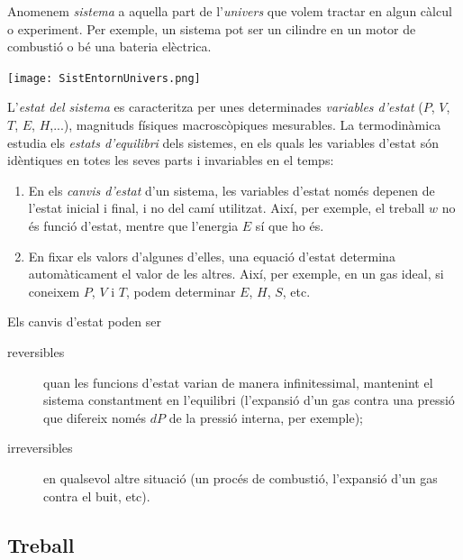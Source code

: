 \begin{mybox}[title={Sistemes, estats i funcions d'estat}]
    Anomenem \emph{sistema} a aquella part de l'\emph{univers} que volem tractar en algun càlcul o experiment. 
Per exemple, un sistema pot ser un cilindre en un motor de combustió o bé una bateria elèctrica.
\begin{center}
\texttt{[image: SistEntornUnivers.png]}
\end{center}
 
L'\textit{estat del sistema} es caracteritza  per unes determinades \textit{variables d'estat} ($P$, $V$, $T$, $E$, $H$,...), magnituds físiques macroscòpiques mesurables. La termodinàmica estudia els \textit{estats d'equilibri} dels sistemes, en els quals les variables d'estat són idèntiques en totes les seves parts i invariables en el temps:
\begin{enumerate}
\item En els \textit{canvis d'estat} d'un sistema, les variables d'estat només depenen de l'estat inicial i final, i no del camí utilitzat. Així, per exemple, el treball $w$ no és funció d'estat, mentre que l'energia $E$ sí que ho és.
\item En fixar els valors d'algunes d'elles, una equació d'estat determina automàticament el valor de les altres. Així, per exemple, en un gas ideal, si coneixem $P$, $V$ i $T$, podem determinar $E$, $H$, $S$, etc.
\end{enumerate}

Els canvis d'estat poden ser 
\begin{description}
\item[reversibles] quan les funcions d'estat varian de manera infinitessimal, mantenint el sistema constantment en l'equilibri (l'expansió d'un gas contra una pressió que difereix només $dP$ de la pressió interna, per exemple);
\item[irreversibles] en qualsevol altre situació (un procés de combustió, l'expansió d'un gas contra el buit, etc).
\end{description}
\end{mybox}

\subsection{Treball}

